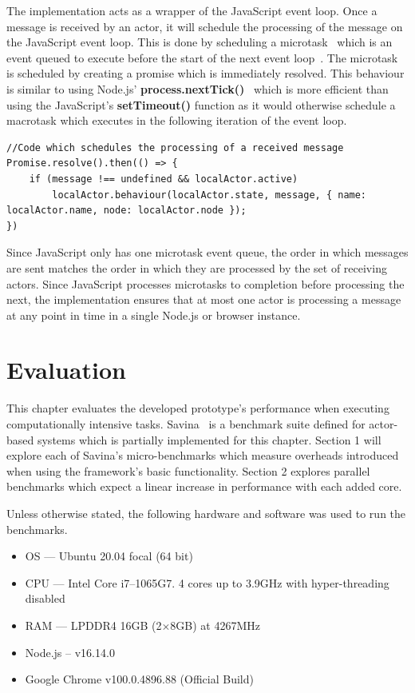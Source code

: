 \documentclass[12pt, a4paper]{report}
\theoremstyle{definition}
\theoremstyle{definition}%
\theoremstyle{definition}%
\theoremstyle{definition}%
\theoremstyle{definition}%
\theoremstyle{definition}%
\begin{document}
The implementation acts as a wrapper of the JavaScript event loop. Once a message is received by an actor, it will schedule the processing of the message on the JavaScript event loop. This is done by scheduling a microtask~\cite{microtasks} which is an event queued to execute before the start of the next event loop~\cite{eventloopbrowser}\cite{eventloopnode}. The microtask is scheduled by creating a promise which is immediately resolved. This behaviour is similar to using Node.js' \textbf{process.nextTick()}~\cite{nexttick} which is more efficient than using the JavaScript's \textbf{setTimeout()} function as it would otherwise schedule a macrotask which executes in the following iteration of the event loop.
\begin{lstlisting}
//Code which schedules the processing of a received message
Promise.resolve().then(() => {
    if (message !== undefined && localActor.active)
        localActor.behaviour(localActor.state, message, { name: localActor.name, node: localActor.node });
})
\end{lstlisting}

Since JavaScript only has one microtask event queue, the order in which messages are sent matches the order in which they are processed by the set of receiving actors. Since JavaScript processes microtasks to completion before processing the next, the implementation ensures that at most one actor is processing a message at any point in time in a single Node.js or browser instance.
\chapter{Evaluation}
This chapter evaluates the developed prototype's performance when executing computationally intensive tasks. Savina~\cite{savina} is a benchmark suite defined for actor-based systems which is partially implemented for this chapter. Section 1 will explore each of Savina's micro-benchmarks which measure overheads introduced when using the framework's basic functionality. Section 2 explores parallel benchmarks which expect a linear increase in performance with each added core. 

Unless otherwise stated, the following hardware and software was used to run the benchmarks.
\begin{itemize}
    \item OS --- Ubuntu 20.04 focal (64 bit)
    \item CPU --- Intel Core i7--1065G7. 4 cores up to 3.9GHz with hyper-threading disabled
    \item RAM --- LPDDR4 16GB (2$\times$8GB) at 4267MHz
    \item Node.js – v16.14.0
    \item Google Chrome v100.0.4896.88 (Official Build)
\end{itemize}
\end{document}
